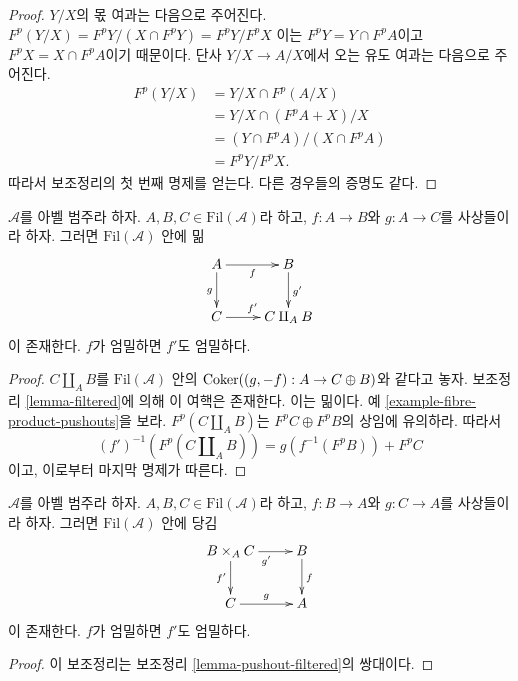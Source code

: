 \begin{proof}
$Y/X$의 몫 여과는 다음으로 주어진다.
$F^p(Y/X) = F^pY/(X \cap F^pY) = F^pY/F^pX$
이는 $F^pY = Y \cap F^pA$이고 $F^pX = X \cap F^pA$이기 때문이다.
단사 $Y/X \to A/X$에서 오는 유도 여과는 다음으로 주어진다.
\begin{align*}
F^p(Y/X) & = Y/X \cap F^p(A/X) \\
& = Y/X \cap (F^pA + X)/X \\
& = (Y \cap F^pA)/(X \cap F^pA) \\
& = F^pY/F^pX.
\end{align*}
따라서 보조정리의 첫 번째 명제를 얻는다. 다른 경우들의 증명도 같다.
\end{proof}

\begin{lemma}
\label{lemma-pushout-filtered}
$\mathcal{A}$를 아벨 범주라 하자. $A, B, C \in \text{Fil}(\mathcal{A})$라
하고, $f : A \to B$와 $g : A \to C$를 사상들이라 하자. 그러면
$\text{Fil}(\mathcal{A})$ 안에 밂
$$
\xymatrix{
A \ar[r]_f \ar[d]_g & B \ar[d]^{g'} \\
C \ar[r]^{f'} & C \amalg_A B
}
$$
이 존재한다. $f$가 엄밀하면 $f'$도 엄밀하다.
\end{lemma}

\begin{proof}
$C \amalg_A B$를 $\text{Fil}(\mathcal{A})$ 안의
$\mathop{\mathrm{Coker}}((g, -f) : A \to C \oplus B)$와 같다고 놓자.
보조정리 \ref{lemma-filtered}에 의해 이 여핵은 존재한다.
이는 밂이다. 예 \ref{example-fibre-product-pushouts}을 보라.
$F^p(C \amalg_A B)$는 $F^pC \oplus F^pB$의 상임에 유의하라. 따라서
$$
(f')^{-1}(F^p(C \amalg_A B)) = g(f^{-1}(F^pB)) + F^pC
$$
이고, 이로부터 마지막 명제가 따른다.
\end{proof}

\begin{lemma}
\label{lemma-fibre-product-filtered}
$\mathcal{A}$를 아벨 범주라 하자. $A, B, C \in \text{Fil}(\mathcal{A})$라
하고, $f : B \to A$와 $g : C \to A$를 사상들이라 하자. 그러면
$\text{Fil}(\mathcal{A})$ 안에 당김
$$
\xymatrix{
B \times_A C \ar[r]_{g'} \ar[d]_{f'} & B \ar[d]^f \\
C \ar[r]^g & A
}
$$
이 존재한다. $f$가 엄밀하면 $f'$도 엄밀하다.
\end{lemma}

\begin{proof}
이 보조정리는 보조정리 \ref{lemma-pushout-filtered}의 쌍대이다.
\end{proof}

